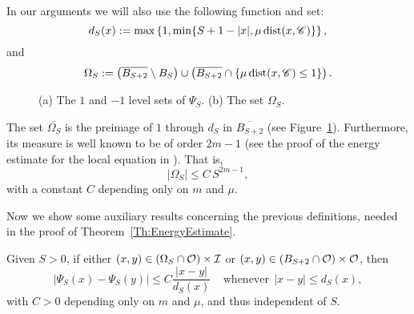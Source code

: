 In our arguments we will also use the following function and set:
$$ 
d_S(x) := \max\left\{1,\min\{S+1-|x|,\mu \operatorname{dist}(x,\mathscr{C})\} \right\},  
$$
and
\begin{equation}
\label{Eq:DefOmegaS}
\Omega_S := \left( \overline{B_{S+2}}\setminus B_S \right) \cup \left(  \overline{B_{S+2}} \cap \{\mu \operatorname{dist}(x,\mathscr{C}) \leq 1\}\right).
\end{equation} 

\begin{figure}
	\centering
	\hspace{-0.32\textwidth}
	\begin{subfigure}{0.21\textwidth}
		\centering
		
	\end{subfigure}
	\hspace{0.28\textwidth}
	\begin{subfigure}{0.21\textwidth}
		\centering
		
	\end{subfigure}
	\caption{(a) The $1$ and $-1$ level sets of $\Psi_S$. (b) The set $\Omega_S$.}
	\label{Fig:PsiSandOmegaS}
\end{figure}

The set $\overline{\Omega_S}$ is the preimage of $1$ through $d_S$ in $\overline{B_{S+2}}$ (see Figure~\ref{Fig:PsiSandOmegaS}). Furthermore, its measure is well known to be of order $2m-1$ (see the proof of the energy estimate for the local equation in \cite{CabreTerraI}). That is,
\begin{equation}
\label{Eq:MeasureOmegaS}
|\Omega_S| \leq C\,S^{2m-1},
\end{equation}
with a constant $C$ depending only on $m$ and $\mu$.


Now we show some auxiliary results concerning the previous definitions, needed in the proof of Theorem~\ref{Th:EnergyEstimate}.

\begin{lemma}
\label{Lemma:AdaptedLipschitzConditionWith_dFunction}
Given $S>0$, if either $(x,y) \in \left(\Omega_S\cap \mathcal{O}\right) \times \mathcal{I}$ or $(x,y)\in \left(B_{S+2}\cap \mathcal{O}\right) \times \mathcal{O}$, then
$$ 
|\Psi_S(x) - \Psi_S(y)| \leq C \frac{|x-y|}{d_S(x)} \ \ \ \ \ \textrm{whenever} \ \ |x-y|\leq d_S(x), 
$$
with $C>0$ depending only on $m$ and $\mu$, and thus independent of $S$.
\end{lemma}

